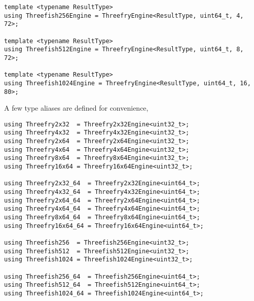 \begin{verbatim}
template <typename ResultType>
using Threefish256Engine = ThreefryEngine<ResultType, uint64_t, 4, 72>;

template <typename ResultType>
using Threefish512Engine = ThreefryEngine<ResultType, uint64_t, 8, 72>;

template <typename ResultType>
using Threefish1024Engine = ThreefryEngine<ResultType, uint64_t, 16, 80>;
\end{verbatim}
A few type aliases are defined for convenience,
\begin{verbatim}
using Threefry2x32  = Threefry2x32Engine<uint32_t>;
using Threefry4x32  = Threefry4x32Engine<uint32_t>;
using Threefry2x64  = Threefry2x64Engine<uint32_t>;
using Threefry4x64  = Threefry4x64Engine<uint32_t>;
using Threefry8x64  = Threefry8x64Engine<uint32_t>;
using Threefry16x64 = Threefry16x64Engine<uint32_t>;

using Threefry2x32_64  = Threefry2x32Engine<uint64_t>;
using Threefry4x32_64  = Threefry4x32Engine<uint64_t>;
using Threefry2x64_64  = Threefry2x64Engine<uint64_t>;
using Threefry4x64_64  = Threefry4x64Engine<uint64_t>;
using Threefry8x64_64  = Threefry8x64Engine<uint64_t>;
using Threefry16x64_64 = Threefry16x64Engine<uint64_t>;

using Threefish256  = Threefish256Engine<uint32_t>;
using Threefish512  = Threefish512Engine<uint32_t>;
using Threefish1024 = Threefish1024Engine<uint32_t>;

using Threefish256_64  = Threefish256Engine<uint64_t>;
using Threefish512_64  = Threefish512Engine<uint64_t>;
using Threefish1024_64 = Threefish1024Engine<uint64_t>;
\end{verbatim}

\section{\texorpdfstring{\mkl \rng}{MKL RNG}}
\label{sec:MKL RNG}

